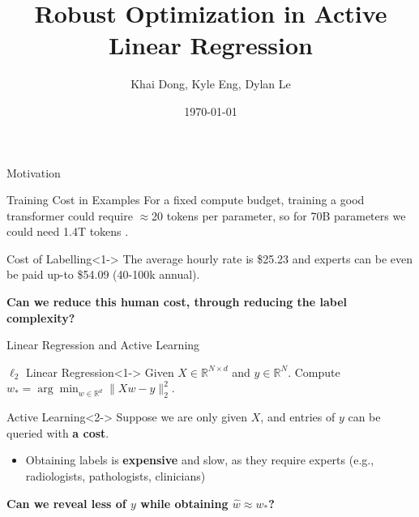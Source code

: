 \documentclass{beamer}
\title[Robust Optimization for ALR]{
    Robust Optimization in Active Linear Regression
}
\author{Khai Dong, Kyle Eng, Dylan Le}
\institute{RPI}
\date{\today}
\newcommand{\R}{\mathbb{R}}
\newcommand{\what}{\hat w}
\newcommand{\wopt}{w_*}
\begin{document}
\begin{frame}
  \titlepage
\end{frame}


\begin{frame}{Motivation}
    \begin{block}{Training Cost in Examples}
    For a fixed compute budget, training a good transformer could require \(\approx\)20 tokens per parameter, so for 70B parameters we could need 1.4T tokens  
    \citep{chinchilla}. 
        
    \end{block}
    \vfill\pause
    \begin{block}{Cost of Labelling}<1->
    The average hourly rate is \$25.23 and experts can be even be paid up-to \$54.09 (40-100k annual)\citep{ziprecruiter_data_annotation_salary}.
    \end{block}
    \textbf{Can we reduce this human cost, through reducing the label complexity?}
\end{frame}
\begin{frame}{Linear Regression and Active Learning}

    \begin{block}{$\ell_2$ Linear Regression}<1->
        Given $X \in \R^{N \times d}$ and $y \in \R^{N}$. Compute $\wopt = \arg \min_{w \in \R^d} \|Xw - y \|_2^2$.
    \end{block}
    \vfill
    \begin{block}{Active Learning}<2->
        Suppose we are only given $X$, and entries of $y$ can be queried with \textbf{a cost}.
        \begin{itemize}
            \item Obtaining labels is \textbf{expensive} and slow, as they require experts (e.g., radiologists, pathologists, clinicians)
        \end{itemize}
        \vfill

    \textbf{Can we reveal less of $y$ while obtaining $\what \approx \wopt$?}
        
    \end{block}

\end{frame}
\end{document}

